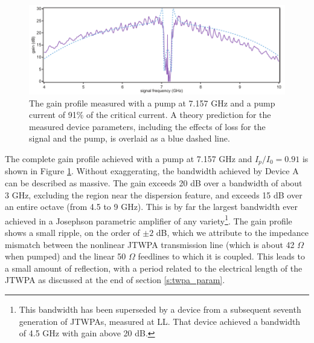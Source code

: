 \begin{figure}
\begin{center}
\includegraphics[width=6in]{twpa_exp/twpa_gain}
\end{center}
\caption[Ultra-broadband gain profile]{The gain profile measured with a pump at 7.157 GHz and a pump current of 91\% of the critical current.  A theory prediction for the measured device parameters, including the effects of loss for the signal and the pump, is overlaid as a blue dashed line.}
\label{fig:twpa_gain_exp}
\end{figure}

The complete gain profile achieved with a pump at 7.157 GHz and $I_p / I_0 = 0.91$ is shown in Figure \ref{fig:twpa_gain_exp}.  Without exaggerating, the bandwidth achieved by Device A can be described as massive.  The gain exceeds 20 dB over a bandwidth of about 3 GHz, excluding the region near the dispersion feature, and exceeds 15 dB over an entire octave (from 4.5 to 9 GHz).  This is by far the largest bandwidth ever achieved in a Josephson parametric amplifier of any variety\footnote{This bandwidth has been superseded by a device from a subsequent seventh generation of JTWPAs, measured at LL.  That device achieved a bandwidth of 4.5 GHz with gain above 20 dB.}.  The gain profile shows a small ripple, on the order of $\pm 2$ dB, which we attribute to the impedance mismatch between the nonlinear JTWPA transmission line (which is about 42 $\Omega$ when pumped) and the linear 50 $\Omega$ feedlines to which it is coupled.  This leads to a small amount of reflection, with a period related to the electrical length of the JTWPA as discussed at the end of section \ref{s:twpa_param}.

